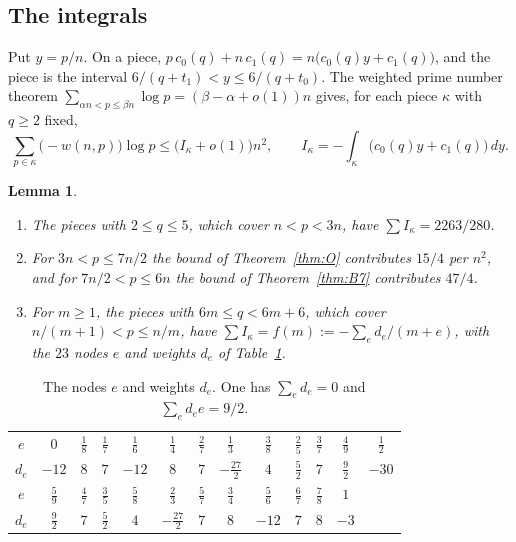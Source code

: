 \documentclass[11pt]{amsart}
\newtheorem{lemma}[theorem]{Lemma}
\theoremstyle{definition}
\theoremstyle{remark}
\numberwithin{equation}{section}
\begin{document}
\subsection{The integrals}
Put $y=p/n$. On a piece, $p\,c_0(q)+n\,c_1(q)=n\bigl(c_0(q)y+c_1(q)\bigr)$, and the piece is the interval
$6/(q+t_1)<y\le6/(q+t_0)$. The weighted prime number theorem $\sum_{\alpha n<p\le\beta n}\log p=(\beta-\alpha+o(1))n$
gives, for each piece $\kappa$ with $q\ge2$ fixed,
\[
 \sum_{p\in\kappa}\bigl(-w(n,p)\bigr)\log p\le\bigl(I_\kappa+o(1)\bigr)n^2,\qquad
 I_\kappa=-\int_\kappa\bigl(c_0(q)y+c_1(q)\bigr)\,dy .
\]

\begin{lemma}\label{lem:bands}
\begin{enumerate}[label=(\roman*)]
\item The pieces with $2\le q\le5$, which cover $n<p<3n$, have $\sum I_\kappa=2263/280$.
\item For $3n<p\le7n/2$ the bound of Theorem~\ref{thm:O} contributes $15/4$ per $n^2$, and for $7n/2<p\le6n$ the bound of
 Theorem~\ref{thm:B7} contributes $47/4$.
\item For $m\ge1$, the pieces with $6m\le q<6m+6$, which cover $n/(m+1)<p\le n/m$, have
 $\sum I_\kappa=f(m):=-\sum_ed_e/(m+e)$, with the $23$ nodes $e$ and weights $d_e$ of Table~\ref{tab:nodes}.
\end{enumerate}
\end{lemma}

\begin{table}[ht]
\centering
\renewcommand{\arraystretch}{1.15}
\setlength{\tabcolsep}{4pt}
\begin{tabular}{@{}c|cccccccccccc@{}}
\toprule
$e$ & $0$ & $\frac18$ & $\frac17$ & $\frac16$ & $\frac14$ & $\frac27$ & $\frac13$ & $\frac38$ & $\frac25$ & $\frac37$ & $\frac49$ & $\frac12$\\
$d_e$ & $-12$ & $8$ & $7$ & $-12$ & $8$ & $7$ & $-\frac{27}2$ & $4$ & $\frac52$ & $7$ & $\frac92$ & $-30$\\
\midrule
$e$ & $\frac59$ & $\frac47$ & $\frac35$ & $\frac58$ & $\frac23$ & $\frac57$ & $\frac34$ & $\frac56$ & $\frac67$ & $\frac78$ & $1$ &\\
$d_e$ & $\frac92$ & $7$ & $\frac52$ & $4$ & $-\frac{27}2$ & $7$ & $8$ & $-12$ & $7$ & $8$ & $-3$ &\\
\bottomrule
\end{tabular}
\caption{The nodes $e$ and weights $d_e$. One has $\sum_ed_e=0$ and $\sum_ed_ee=9/2$.}\label{tab:nodes}
\end{table}
\end{document}
